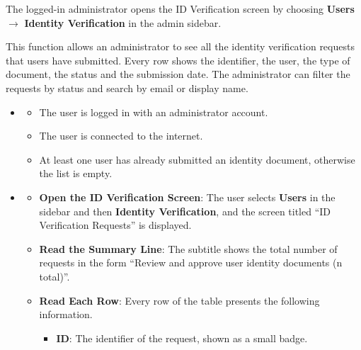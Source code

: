  The logged-in administrator opens the ID Verification screen by choosing \textbf{Users} $\rightarrow$ \textbf{Identity Verification} in the admin sidebar.

 This function allows an administrator to see all the identity verification requests that users have submitted. Every row shows the identifier, the user, the type of document, the status and the submission date. The administrator can filter the requests by status and search by email or display name.


\begin{itemize}[leftmargin=1.6em,topsep=4pt,itemsep=3pt,parsep=0pt,label=$\bullet$]
    \item {}
        \begin{itemize}[leftmargin=2.2em,topsep=2pt,itemsep=3pt,parsep=0pt,label=$\circ$]
            \item The user is logged in with an administrator account.
            \item The user is connected to the internet.
            \item At least one user has already submitted an identity document, otherwise the list is empty.
        \end{itemize}
    \item {}
        \begin{itemize}[leftmargin=2.2em,topsep=2pt,itemsep=3pt,parsep=0pt,label=$\circ$]
            \item \textbf{Open the ID Verification Screen}: The user selects \textbf{Users} in the sidebar and then \textbf{Identity Verification}, and the screen titled ``ID Verification Requests'' is displayed.
            \item \textbf{Read the Summary Line}: The subtitle shows the total number of requests in the form ``Review and approve user identity documents (n total)''.
            \item \textbf{Read Each Row}: Every row of the table presents the following information.
                \begin{itemize}[leftmargin=2.2em,topsep=2pt,itemsep=3pt,parsep=0pt,label=$\blacksquare$]
                    \item \textbf{ID}: The identifier of the request, shown as a small badge.

\end{itemize}
\end{itemize}
\end{itemize}
